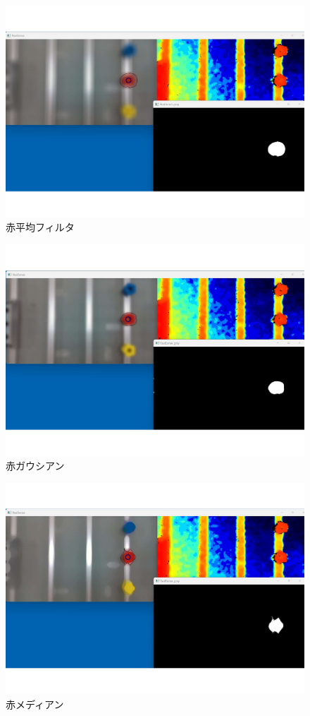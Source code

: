 \begin{figure}[H]
  \centering
  \includegraphics[scale=0.5]{sozai/b.pdf}
  \caption{赤平均フィルタ}
\end{figure}

\begin{figure}[H]
  \centering
  \includegraphics[scale=0.5]{sozai/c.pdf}
  \caption{赤ガウシアン}
\end{figure}

\begin{figure}[H]
  \centering
  \includegraphics[scale=0.5]{sozai/d.pdf}
  \caption{赤メディアン}
\end{figure}

